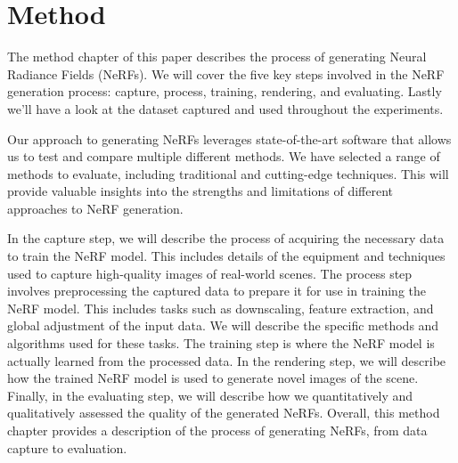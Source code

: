 \chapter{Method}

The method chapter of this paper describes the process of generating Neural Radiance Fields (NeRFs). We will cover the five key steps involved in the NeRF generation process: capture, process, training, rendering, and evaluating. Lastly we'll have a look at the dataset captured and used throughout the experiments.

Our approach to generating NeRFs leverages state-of-the-art software that allows us to test and compare multiple different methods. We have selected a range of methods to evaluate, including traditional and cutting-edge techniques. This will provide valuable insights into the strengths and limitations of different approaches to NeRF generation.

In the capture step, we will describe the process of acquiring the necessary data to train the NeRF model. This includes details of the equipment and techniques used to capture high-quality images of real-world scenes. The process step involves preprocessing the captured data to prepare it for use in training the NeRF model. This includes tasks such as downscaling, feature extraction, and global adjustment of the input data. We will describe the specific methods and algorithms used for these tasks. The training step is where the NeRF model is actually learned from the processed data. In the rendering step, we will describe how the trained NeRF model is used to generate novel images of the scene. Finally, in the evaluating step, we will describe how we quantitatively and qualitatively assessed the quality of the generated NeRFs. Overall, this method chapter provides a description of the process of generating NeRFs, from data capture to evaluation.


\begin{comment}
Describe the pipeline used to generate NeRFs

- Capture (video, image, polycam, etc.)
- Process (COLMAP, or direct extraction from e.g. Polycam)
    - Configuration of COLMAP
- Train (Different models)
    - Configuration of model
- Render (Real-time rendering vs. slow rendering)
- Evaluate (PSNR, SSIM, LPIPS)
- Export

- Pipelines created
    - Pipeline to test 
\end{comment}


